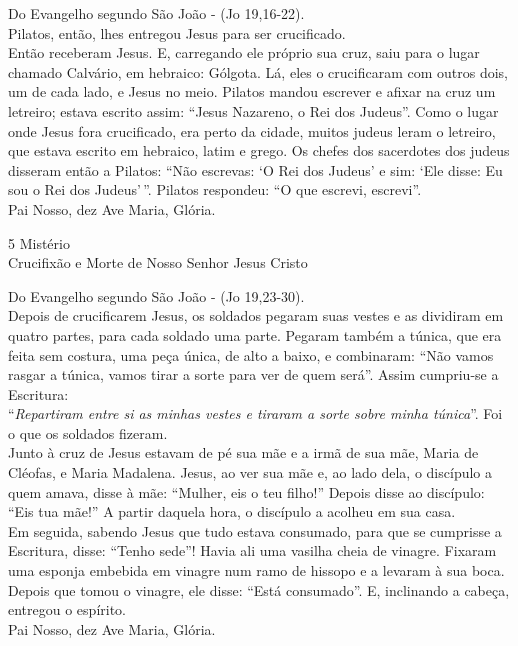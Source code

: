 \documentclass{book}
\begin{document}
\begin{flushleft}
    Do Evangelho segundo São João - (\textcolor{VioletRed2}{Jo 19,16-22}). \\
    \hfill{} \break{}
    Pilatos, então, lhes entregou Jesus para ser crucificado.
    \vspace{.2cm} \\
    Então receberam Jesus. E, carregando ele próprio sua cruz, saiu para o lugar chamado Calvário, em hebraico: Gólgota. Lá, eles o crucificaram com outros dois, um de cada lado, e Jesus no meio. Pilatos mandou escrever e afixar na cruz um letreiro; estava escrito assim: ``Jesus Nazareno, o Rei dos Judeus''. Como o lugar onde Jesus fora crucificado, era perto da cidade, muitos judeus leram o letreiro, que estava escrito em hebraico, latim e grego. Os chefes dos sacerdotes dos judeus disseram então a Pilatos: ``Não escrevas: `O Rei dos Judeus' e sim: `Ele disse: Eu sou o Rei dos Judeus'\,''. Pilatos respondeu: ``O que escrevi, escrevi''. \\
    \hfill{} \break{}
    Pai Nosso, dez Ave Maria, Glória.
\end{flushleft}
\newpage
\begin{center}
    5\textordmasculine{} Mistério \\ Crucifixão e Morte de Nosso Senhor Jesus Cristo
\end{center}
\begin{flushleft}
    Do Evangelho segundo São João - (\textcolor{VioletRed2}{Jo 19,23-30}). \\
    \hfill{} \break{}
    Depois de crucificarem Jesus, os soldados pegaram suas vestes e as dividiram em quatro partes, para cada soldado uma parte. Pegaram também a túnica, que era feita sem costura, uma peça única, de alto a baixo, e combinaram: ``Não vamos rasgar a túnica, vamos tirar a sorte para ver de quem será''. Assim cumpriu-se a Escritura:
    \vspace{.2cm} \\
    ``\textit{Repartiram entre si as minhas vestes e tiraram a sorte sobre minha túnica}''. Foi o que os soldados fizeram.
    \vspace{.2cm} \\
    Junto à cruz de Jesus estavam de pé sua mãe e a irmã de sua mãe, Maria de Cléofas, e Maria Madalena. Jesus, ao ver sua mãe e, ao lado dela, o discípulo a quem amava, disse à mãe: ``Mulher, eis o teu filho!'' Depois disse ao discípulo: ``Eis tua mãe!'' A partir daquela hora, o discípulo a acolheu em sua casa.
    \vspace{.2cm} \\
    Em seguida, sabendo Jesus que tudo estava consumado, para que se cumprisse a Escritura, disse: ``Tenho sede''! Havia ali uma vasilha cheia de vinagre. Fixaram uma esponja embebida em vinagre num ramo de hissopo e a levaram à sua boca. Depois que tomou o vinagre, ele disse: ``Está consumado''. E, inclinando a cabeça, entregou o espírito. \\
    \hfill{} \break{}
    Pai Nosso, dez Ave Maria, Glória.
\end{flushleft}
\end{document}
